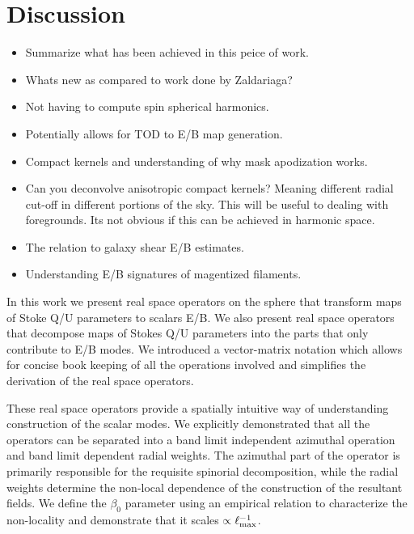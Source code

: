 \section{Discussion}\label{sec:discussion}

\begin{itemize}
\item Summarize what has been achieved in this peice of work.
\item Whats new as compared to work done by Zaldariaga?
\item Not having to compute spin spherical harmonics.
\item Potentially allows for TOD to E/B map generation.
\item Compact kernels and understanding of why mask apodization works.
\item Can you deconvolve anisotropic compact kernels? Meaning different radial cut-off in different portions of the sky. This will be useful to dealing with foregrounds. Its not obvious if this can be achieved in harmonic space.  
\item The relation to galaxy shear E/B estimates.
\item Understanding E/B signatures of magentized filaments.
\end{itemize}

 

In this work we present real space operators on the sphere that transform maps of Stoke Q/U parameters to scalars E/B. We  also present real space operators that decompose maps of Stokes Q/U parameters into the parts that only contribute to E/B modes. We introduced a vector-matrix notation which allows for concise book keeping of all the operations involved and simplifies the derivation of the real space operators. 

These real space operators provide a spatially intuitive way of understanding construction of the scalar modes. We explicitly  demonstrated that all the operators can be separated into a band limit independent azimuthal operation and band limit dependent radial weights. The azimuthal part of the operator is primarily responsible for the requisite spinorial decomposition, while the radial weights determine the non-local dependence of the construction of the resultant fields. We define the $\beta_0$ parameter using an empirical relation to characterize the non-locality and demonstrate that it scales $\propto \ell_{\rm max}^{-1}$.

